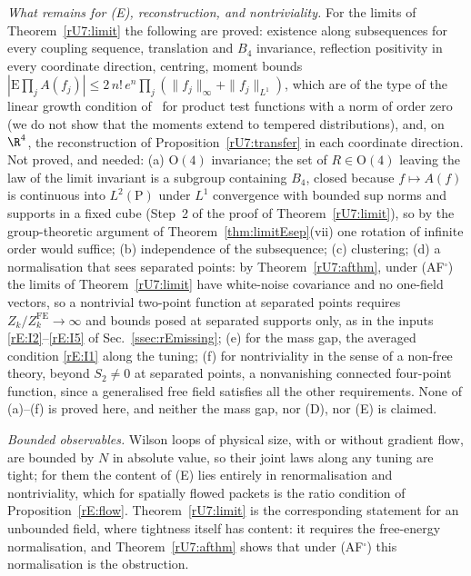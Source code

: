 \emph{What remains for (E), reconstruction, and nontriviality.} For the limits
of Theorem~\ref{rU7:limit} the following are proved: existence along
subsequences for every coupling sequence, translation and $B_4$ invariance,
reflection positivity in every coordinate direction, centring, moment
bounds $|\mathrm E\prod_jA(f_j)|\le2\,n!\,e^n\prod_j(\|f_j\|_\infty+\|f_j\|
_{L^1})$, which are of the type of the linear growth condition
of~\cite{OS75} for product test functions with a norm of order zero (we do
not show that the moments extend to tempered distributions), and, on
$\R^4$, the reconstruction of Proposition~\ref{rU7:transfer} in each
coordinate direction. Not proved, and needed:
(a) $\mathrm O(4)$ invariance; the set of $R\in\mathrm O(4)$ leaving the law of
the limit invariant is a subgroup containing $B_4$, closed because $f\mapsto
A(f)$ is continuous into $L^2(\mathrm P)$ under $L^1$ convergence with bounded
sup norms and supports in a fixed cube (Step~2 of the proof of
Theorem~\ref{rU7:limit}), so by the group-theoretic argument of
Theorem~\ref{thm:limitEsep}(vii) one rotation of infinite order would
suffice; (b) independence of the subsequence; (c) clustering; (d) a
normalisation that sees separated points: by Theorem~\ref{rU7:afthm}, under
(AF$^\square$) the limits of Theorem~\ref{rU7:limit} have white-noise
covariance and no one-field vectors, so a nontrivial two-point function at
separated points requires $Z_k/Z_k^{\mathrm{FE}}\to\infty$ and bounds posed at
separated supports only, as in the inputs \ref{rE:I2}--\ref{rE:I5} of
Sec.~\ref{ssec:rEmissing}; (e) for the mass gap, the averaged condition
\ref{rE:I1} along the tuning; (f) for nontriviality in the sense of a non-free
theory, beyond $S_2\ne0$ at separated points, a nonvanishing connected
four-point function, since a generalised free field satisfies all the other
requirements. None of (a)--(f) is proved here, and neither the mass gap, nor
(D), nor (E) is claimed.

\emph{Bounded observables.} Wilson loops of physical size, with or without
gradient flow, are bounded by $N$ in absolute value, so their joint laws
along any tuning are tight; for them the content of (E) lies entirely in
renormalisation and nontriviality, which for spatially flowed packets is
the ratio condition of Proposition~\ref{rE:flow}.
Theorem~\ref{rU7:limit} is the corresponding statement for an unbounded
field, where tightness itself has content: it requires the free-energy
normalisation, and Theorem~\ref{rU7:afthm} shows that under (AF$^\square$)
this normalisation is the obstruction.
